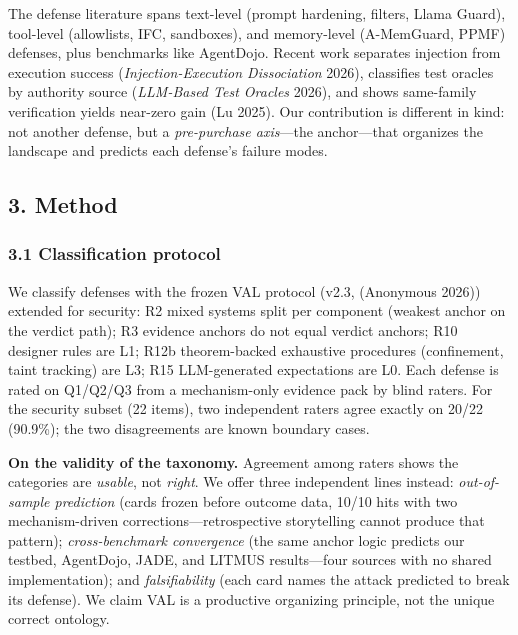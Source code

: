 \documentclass[

]{article}
\begin{document}
The defense literature spans text-level (prompt hardening, filters, Llama Guard), tool-level (allowlists, IFC, sandboxes), and memory-level (A-MemGuard, PPMF) defenses, plus benchmarks like AgentDojo. Recent work separates injection from execution success (\emph{Injection-Execution Dissociation} 2026), classifies test oracles by authority source (\emph{LLM-Based Test Oracles} 2026), and shows same-family verification yields near-zero gain ({Lu} 2025). Our contribution is different in kind: not another defense, but a \emph{pre-purchase axis}---the anchor---that organizes the landscape and predicts each defense's failure modes.



\subsection{3. Method}\label{method}



\subsubsection{3.1 Classification protocol}\label{classification-protocol}



We classify defenses with the frozen VAL protocol (v2.3, (Anonymous 2026)) extended for security: R2 mixed systems split per component (weakest anchor on the verdict path); R3 evidence anchors do not equal verdict anchors; R10 designer rules are L1; R12b theorem-backed exhaustive procedures (confinement, taint tracking) are L3; R15 LLM-generated expectations are L0. Each defense is rated on Q1/Q2/Q3 from a mechanism-only evidence pack by blind raters. For the security subset (22 items), two independent raters agree exactly on 20/22 (90.9\%); the two disagreements are known boundary cases.



\textbf{On the validity of the taxonomy.} Agreement among raters shows the categories are \emph{usable}, not \emph{right}. We offer three independent lines instead: \emph{out-of-sample prediction} (cards frozen before outcome data, 10/10 hits with two mechanism-driven corrections---retrospective storytelling cannot produce that pattern); \emph{cross-benchmark convergence} (the same anchor logic predicts our testbed, AgentDojo, JADE, and LITMUS results---four sources with no shared implementation); and \emph{falsifiability} (each card names the attack predicted to break its defense). We claim VAL is a productive organizing principle, not the unique correct ontology.
\end{document}
